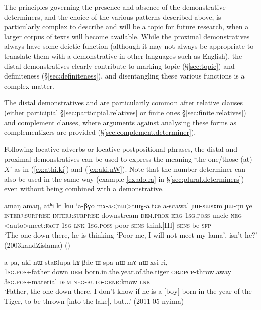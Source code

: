 The principles governing the presence and absence of the demonstrative determiners, and the choice of the various patterns described above, is particularly complex to describe and will be a topic for future research, when a larger corpus of texts will become available. While the proximal demonstratives always have some deictic function (although it may not always be appropriate to translate them with a demonstrative in other languages such as English), the distal demonstratives clearly contribute to marking topic (§\ref{sec:topic}) and definiteness (§\ref{sec:definiteness}), and disentangling these various functions is a complex matter.

The distal demonstratives  and  are particularily common after relative clauses (either participial §\ref{sec:participial.relatives} or finite ones §\ref{sec:finite.relatives}) and complement clauses, where arguments against analysing these forms as complementizers are provided (§\ref{sec:complement.determiner}).

Following locative adverbs or locative postpositional phrases, the distal and proximal demonstratives can be used to express the meaning `the one/those (at) $X$' as in (\ref{ex:athi.ki}) and (\ref{ex:aki.nW}). Note that the number determiner  can also be used in the same way (example \ref{ex:alo.ra} in §\ref{sec:plural.determiners}) even without being combined with a demonstrative.

\begin{exe}
\ex \label{ex:athi.ki}
\gll amaŋ amaŋ, atʰi ki kɯ `a-βɣo mɤ-a<nɯ>tɯɣ-a tɕe a-scawa' ɲɯ-sɯsɤm ɲɯ-ŋu ɣe \\
\textsc{interj}:\textsc{surprise} \textsc{interj}:\textsc{surprise}  downstream \textsc{dem}.\textsc{prox} \textsc{erg} \textsc{1sg}.\textsc{poss}-uncle \textsc{neg}-<auto>meet:\textsc{fact}-\textsc{1sg} \textsc{lnk} \textsc{1sg}.\textsc{poss}-poor \textsc{sens}-think[III] \textsc{sens}-be \textsc{sfp} \\
\glt `The one down there, he is thinking `Poor me, I will not meet my lama', isn't he?' (2003kandZislama)
()
\end{exe}

\begin{exe}
\ex \label{ex:aki.nW}
\gll a-pa, aki nɯ staʁlupa kɤ-βde ɯ-spa nɯ mɤ-nɯ-xsi ri, \\
\textsc{1sg}.\textsc{poss}-father down \textsc{dem} born.in.the.year.of.the.tiger \textsc{obj}:\textsc{pcp}-throw.away \textsc{3sg}.\textsc{poss}-material \textsc{dem} \textsc{neg}-\textsc{auto}-\textsc{genr}:know \textsc{lnk} \\
\glt `Father, the one down there, I don't know if he is a [boy] born in the year of the Tiger, to be thrown [into the lake], but...' (2011-05-nyima)
\end{exe}

